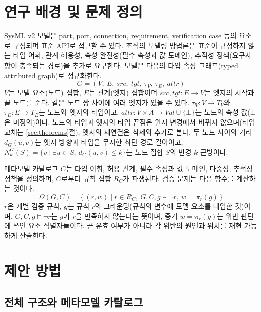 \section{연구 배경 및 문제 정의}

SysML v2 모델은 part, port, connection, requirement, verification case 등의 요소로 구성되며 표준 API로
접근할 수 있다. 조직의 모델링 방법론은 표준이 규정하지 않는 타입 어휘, 관계 허용성, 속성 완전성(필수
속성과 값 도메인), 추적성 정책(요구사항이 충족되는 경로)을 추가로 요구한다. 모델은 다음의 타입 속성
그래프(typed attributed graph)로 정규화한다.
\begin{equation}
G = (V,\ E,\ \mathit{src},\ \mathit{tgt},\ \tau_V,\ \tau_E,\ \mathit{attr})
\label{eq:graph}
\end{equation}
$V$는 모델 요소(노드) 집합, $E$는 관계(엣지) 집합이며 $\mathit{src},\mathit{tgt}: E \rightarrow V$는
엣지의 시작과 끝 노드를 준다. 같은 노드 쌍 사이에 여러 엣지가 있을 수 있다.
$\tau_V: V \rightarrow T_V$와 $\tau_E: E \rightarrow T_E$는 노드와 엣지의 타입이고,
$\mathit{attr}: V \times A \rightarrow \mathit{Val} \cup \{\bot\}$는 노드의 속성 값($\bot$은 미정의)이다.
노드의 타입과 엣지의 타입$\cdot$끝점은 원시 변경에서 바뀌지 않으며(타입 교체는 \ref{sec:theorems}절), 엣지의
재연결은 삭제와 추가로 본다.
두 노드 사이의 거리 $d_G(u,v)$는 엣지 방향과 타입을 무시한 최단 경로 길이이고,
$N_k^G(S) = \{v \mid \exists u \in S,\ d_G(u,v) \le k\}$는 노드 집합 $S$의 반경 $k$ 근방이다.

메타모델 카탈로그 $C$는 타입 어휘, 허용 관계, 필수 속성과 값 도메인, 다중성,
추적성 정책을 정의하며, $C$로부터 규칙 집합 $R_C$가 파생된다. 검증 문제는 다음 함수를 계산하는 것이다.
\begin{equation}
\Omega(G, C) = \{\, (r, w) \mid r \in R_C,\ G,C,g \models \neg r,\ w = \pi_r(g) \,\}
\end{equation}
$r$은 개별 검증 규칙, $g$는 규칙 $r$의 그라운딩(규칙의 변수에 모델 요소를 대입한 것)이며,
$G,C,g \models \neg r$는 $g$가 $r$을 만족하지 않는다는 뜻이며, 증거 $w = \pi_r(g)$는 위반 판단에 쓰인 요소
식별자들이다. 곧 유효 여부가 아니라 각 위반의 원인과 위치를 재현 가능하게 산출한다.

\section{제안 방법}

\subsection{전체 구조와 메타모델 카탈로그}
\label{sec:arch}

